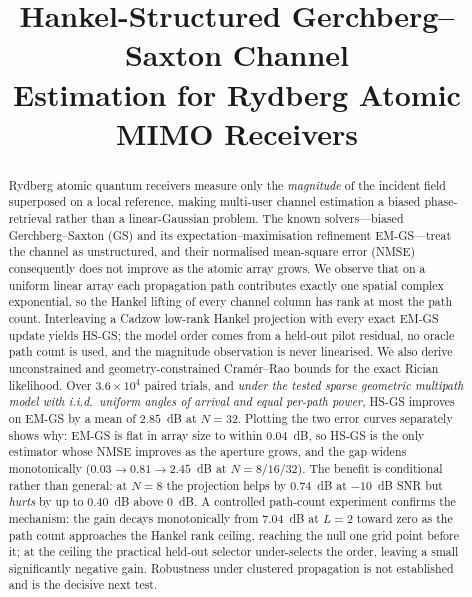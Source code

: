 \documentclass[conference]{IEEEtran}
\begin{document}
\title{Hankel-Structured Gerchberg--Saxton Channel\\Estimation for Rydberg Atomic MIMO Receivers}

\author{
}

\maketitle

\renewcommand{\topfraction}{0.98}
\renewcommand{\bottomfraction}{0.9}
\renewcommand{\textfraction}{0.03}
\renewcommand{\floatpagefraction}{0.92}
\setlength{\textfloatsep}{6pt plus 2pt minus 2pt}
\setlength{\floatsep}{5pt plus 2pt minus 2pt}
\setlength{\intextsep}{6pt plus 2pt minus 2pt}
\setlength{\abovedisplayskip}{4pt plus 2pt minus 2pt}
\setlength{\belowdisplayskip}{4pt plus 2pt minus 2pt}

\begin{abstract}
Rydberg atomic quantum receivers measure only the \emph{magnitude} of the
incident field superposed on a local reference, making multi-user channel
estimation a biased phase-retrieval rather than a linear-Gaussian problem. The
known solvers---biased Gerchberg--Saxton (GS) and its expectation--maximisation refinement EM-GS---treat the channel as unstructured, and their
normalised mean-square error (NMSE) consequently does not improve as the
atomic array grows. We observe that on a uniform linear array each propagation
path contributes exactly one spatial complex exponential, so the Hankel
lifting of every channel column has rank at most the path count. Interleaving
a Cadzow low-rank Hankel projection with every exact EM-GS update yields HS-GS; the model order comes from a held-out pilot residual, no oracle path count
is used, and the magnitude observation is never linearised. We also derive
unconstrained and geometry-constrained Cram\'er--Rao bounds for the exact
Rician likelihood. Over $3.6\times10^{4}$ paired trials, and \emph{under the tested sparse
geometric multipath model with i.i.d.\ uniform angles of arrival and equal
per-path power}, HS-GS improves on EM-GS by a mean of $2.85$~dB at $N=32$.
Plotting the two error curves separately shows why: EM-GS is flat in array
size to within $0.04$~dB, so HS-GS is the only estimator whose NMSE improves
as the aperture grows, and the gap widens monotonically
($0.03\to0.81\to2.45$~dB at $N=8/16/32$). The benefit is conditional rather
than general: at $N=8$ the projection helps by $0.74$~dB at $-10$~dB SNR but
\emph{hurts} by up to $0.40$~dB above $0$~dB. A controlled path-count
experiment confirms the mechanism: the gain decays monotonically from
$7.04$~dB at $L=2$ toward zero as the path count approaches the Hankel rank
ceiling, reaching the null one grid point before it; at the ceiling the
practical held-out selector under-selects the order, leaving a small
significantly negative gain. Robustness under clustered
propagation is not established and is the decisive next test.
\end{abstract}
\end{document}
